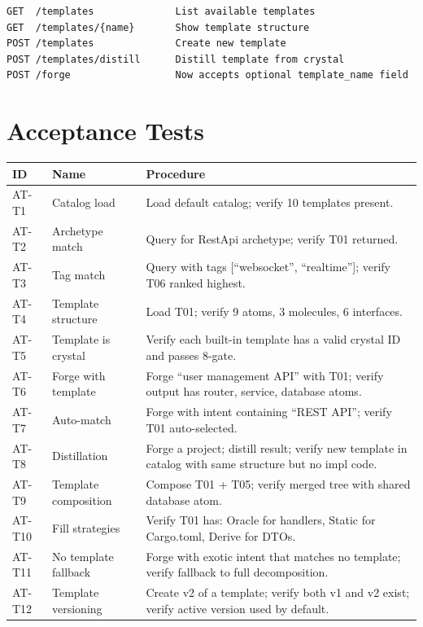 \documentclass[11pt,a4paper,twoside]{article}
\theoremstyle{definition}
\theoremstyle{plain}
\theoremstyle{remark}
\begin{document}
\begin{lstlisting}[title={New Gateway Endpoints}]
GET  /templates              List available templates
GET  /templates/{name}       Show template structure
POST /templates              Create new template
POST /templates/distill      Distill template from crystal
POST /forge                  Now accepts optional template_name field
\end{lstlisting}


\part{Acceptance Tests}\label{part:tests}

\begin{longtable}{l l p{5.5cm}}
\toprule
\textbf{ID} & \textbf{Name} & \textbf{Procedure} \\
\midrule
\endfirsthead \midrule \endhead \bottomrule \endfoot
AT-T1 & Catalog load & Load default catalog; verify 10 templates
  present. \\
AT-T2 & Archetype match & Query for RestApi archetype; verify T01
  returned. \\
AT-T3 & Tag match & Query with tags [``websocket'', ``realtime''];
  verify T06 ranked highest. \\
AT-T4 & Template structure & Load T01; verify 9 atoms, 3 molecules,
  6 interfaces. \\
AT-T5 & Template is crystal & Verify each built-in template has a
  valid crystal ID and passes 8-gate. \\
AT-T6 & Forge with template & Forge ``user management API'' with T01;
  verify output has router, service, database atoms. \\
AT-T7 & Auto-match & Forge with intent containing ``REST API'';
  verify T01 auto-selected. \\
AT-T8 & Distillation & Forge a project; distill result; verify new
  template in catalog with same structure but no impl code. \\
AT-T9 & Template composition & Compose T01 + T05; verify merged tree
  with shared database atom. \\
AT-T10 & Fill strategies & Verify T01 has: Oracle for handlers,
  Static for Cargo.toml, Derive for DTOs. \\
AT-T11 & No template fallback & Forge with exotic intent that matches
  no template; verify fallback to full decomposition. \\
AT-T12 & Template versioning & Create v2 of a template; verify both
  v1 and v2 exist; verify active version used by default. \\
\end{longtable}
\end{document}
